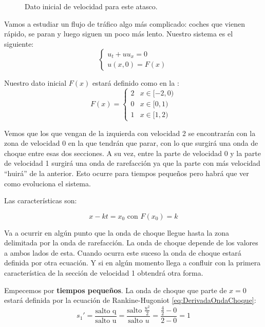 		\begin{example}[Zona central de atasco]

			\begin{wrapfigure}[8]{R}{0.4\textwidth}
				\centering
				\caption{Dato inicial de velocidad para este atasco.}
				\label{fig:FTresVelocidades}
			\end{wrapfigure}

			Vamos a estudiar un flujo de tráfico algo más complicado: coches que vienen rápido, se paran y luego siguen un poco más lento. Nuestro sistema es el siguiente: \[
				\begin{cases}
					u_t + u u_x = 0 \\
					u(x,0) = F(x)
				\end{cases}
			\]

			Nuestro dato inicial $F(x)$ estará definido como en la : \[
				F(x) = \begin{cases}
					2 & x ∈ [-2, 0) \\
					0 & x ∈ [0, 1) \\
					1 & x ∈ [1, 2)
				\end{cases}
			\]




			Vemos que los que vengan de la izquierda con velocidad 2 se encontrarán con la zona de velocidad 0 en la que tendrán que parar, con lo que surgirá una onda de choque entre esas dos secciones. A su vez, entre la parte de velocidad 0 y la parte de velocidad 1 surgirá una onda de rarefacción ya que la parte con más velocidad ``huirá'' de la anterior. Esto ocurre para tiempos pequeños pero habrá que ver como evoluciona el sistema.

			Las características son:

			$$x - kt = x_0 \text{ con } F(x_0) = k$$

			Va a ocurrir en algún punto que la onda de choque llegue hasta la zona delimitada por la onda de rarefacción. La onda de choque depende de los valores a ambos lados de esta. Cuando ocurra este suceso la onda de choque estará definida por otra ecuación. Y si en algún momento llega a confluir con la primera característica de la sección de velocidad 1 obtendrá otra forma.


			Empecemos por \textbf{tiempos pequeños}. La onda de choque que parte de $x=0$ estará definida por la ecuación de Rankine-Hugoniot \eqref{eq:DerivadaOndaChoque}:
			\[ s_1' = \frac{\text{salto q}}{\text{salto u}} = \frac{\text{salto }\frac{u^2}{2}}{\text{salto }u} = \frac{\frac{4}{2} - 0}{2-0} = 1 \]


\end{example}
